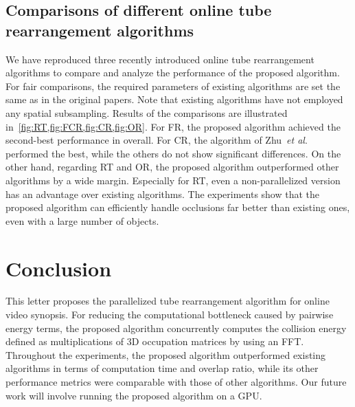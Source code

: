 \documentclass[11pt]{hyu_thesis}
\newcommand{\etal}{\textit{et al}.}
\begin{document}
\subsection{Comparisons of different online tube rearrangement algorithms}
We have reproduced three recently introduced online tube rearrangement algorithms to compare and analyze the performance of the proposed algorithm. For fair comparisons, the required parameters of existing algorithms are set the same as in the original papers. Note that existing algorithms have not employed any spatial subsampling. Results of the comparisons are illustrated in~\cref{fig:RT,fig:FCR,fig:CR,fig:OR}. For FR, the proposed algorithm achieved the second-best performance in overall. For CR, the algorithm of Zhu~\etal~\cite{JianqingZhu2015} performed the best, while the others do not show significant differences. On the other hand, regarding RT and OR, the proposed algorithm outperformed other algorithms by a wide margin. Especially for RT, even a non-parallelized version has an advantage over existing algorithms. The experiments show that the proposed algorithm can efficiently handle occlusions far better than existing ones, even with a large number of objects.

\section{Conclusion}
\label{sec:conc}
This letter proposes the parallelized tube rearrangement algorithm for online video synopsis. For reducing the computational bottleneck caused by pairwise energy terms, the proposed algorithm concurrently computes the collision energy defined as multiplications of 3D occupation matrices by using an FFT. Throughout the experiments, the proposed algorithm outperformed existing algorithms in terms of computation time and overlap ratio, while its other performance metrics were comparable with those of other algorithms. Our future work will involve running the proposed algorithm on a GPU.



\end{document}
